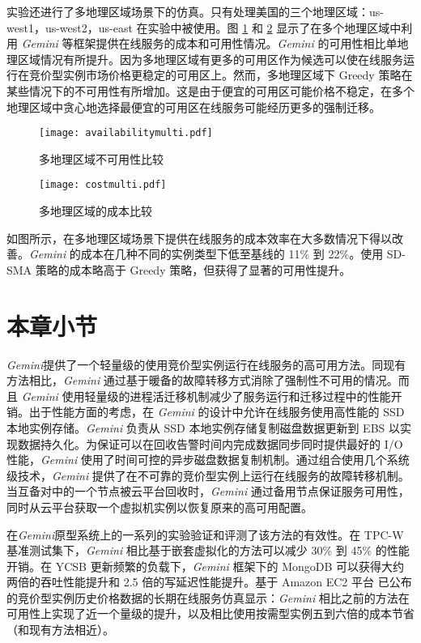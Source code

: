 实验还进行了多地理区域场景下的仿真。只有处理美国的三个地理区域：us-west1，us-west2，us-east 在实验中被使用。图 \ref{figure:unavailabilitymulti} 和 \ref{figure:costmulti} 显示了在多个地理区域中利用 \emph{Gemini} 等框架提供在线服务的成本和可用性情况。\emph{Gemini} 的可用性相比单地理区域情况有所提升。因为多地理区域有更多的可用区作为候选可以使在线服务运行在竞价型实例市场价格更稳定的可用区上。然而，多地理区域下 Greedy 策略在某些情况下的不可用性有所增加。这是由于便宜的可用区可能价格不稳定，在多个地理区域中贪心地选择最便宜的可用区在线服务可能经历更多的强制迁移。
\begin{figure}[]
  \centering
  \texttt{[image: availabilitymulti.pdf]}
  \caption{多地理区域不可用性比较}
  \label{figure:unavailabilitymulti}
\end{figure}

\begin{figure}[]
  \centering
  \texttt{[image: costmulti.pdf]}
  \caption{多地理区域的成本比较}
  \label{figure:costmulti}
\end{figure}

如图所示，在多地理区域场景下提供在线服务的成本效率在大多数情况下得以改善。\emph{Gemini} 的成本在几种不同的实例类型下低至基线的 11\% 到 22\%。使用 SD-SMA 策略的成本略高于 Greedy 策略，但获得了显著的可用性提升。

\section{本章小节}
\emph{Gemini}提供了一个轻量级的使用竞价型实例运行在线服务的高可用方法。同现有方法相比，\emph{Gemini} 通过基于暖备的故障转移方式消除了强制性不可用的情况。而且 \emph{Gemini} 使用轻量级的进程活迁移机制减少了服务运行和迁移过程中的性能开销。出于性能方面的考虑，在 \emph{Gemini} 的设计中允许在线服务使用高性能的 SSD 本地实例存储。\emph{Gemini} 负责从 SSD 本地实例存储复制磁盘数据更新到 EBS 以实现数据持久化。为保证可以在回收告警时间内完成数据同步同时提供最好的 I/O 性能，\emph{Gemini} 使用了时间可控的异步磁盘数据复制机制。通过组合使用几个系统级技术，\emph{Gemini} 提供了在不可靠的竞价型实例上运行在线服务的故障转移机制。当互备对中的一个节点被云平台回收时，\emph{Gemini} 通过备用节点保证服务可用性，同时从云平台获取一个虚拟机实例以恢复原来的高可用配置。

在\emph{Gemini}原型系统上的一系列的实验验证和评测了该方法的有效性。在 TPC-W 基准测试集下，\emph{Gemini} 相比基于嵌套虚拟化的方法可以减少 30\% 到 45\% 的性能开销。在 YCSB 更新频繁的负载下，\emph{Gemini} 框架下的 MongoDB 可以获得大约两倍的吞吐性能提升和 2.5 倍的写延迟性能提升。基于 Amazon EC2 平台 已公布的竞价型实例历史价格数据的长期在线服务仿真显示：\emph{Gemini} 相比之前的方法在可用性上实现了近一个量级的提升，以及相比使用按需型实例五到六倍的成本节省（和现有方法相近）。